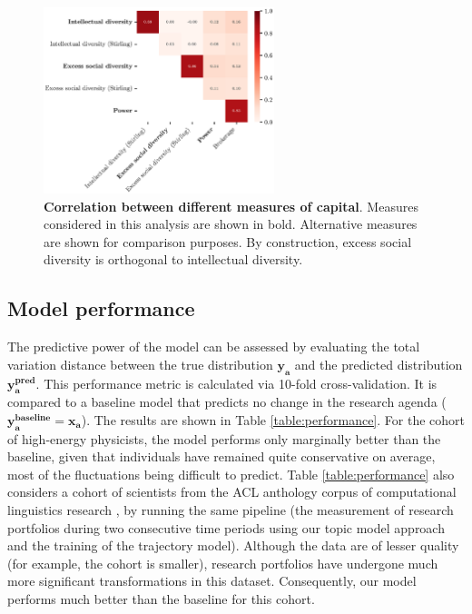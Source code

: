 \documentclass{article}
\begin{document}
\begin{figure}[h]
    \centering
    \includegraphics[width=0.6\textwidth]{plots/capital_measures.eps}
    \caption{\textbf{Correlation between different measures of capital}. Measures considered in this analysis are shown in bold. Alternative measures are shown for comparison purposes. By construction, excess social diversity is orthogonal to intellectual diversity. }
    \label{fig:capital_measures}
\end{figure}

\subsection{\label{appendix:model-performance}Model performance}

The predictive power of the model can be assessed by evaluating the total variation distance between the true distribution $\bm{y_a}$ and the predicted distribution $\bm{y_a^{\text{pred}}}$. This performance metric is calculated via 10-fold cross-validation. It is compared  to a baseline model that predicts no change in the research agenda ($\bm{y_a^{\text{baseline}}}=\bm{x_a}$). The results are shown in Table \ref{table:performance}. For the cohort of high-energy physicists, the model performs only marginally better than the baseline, given that individuals have remained quite conservative on average, most of the fluctuations being difficult to predict. Table \ref{table:performance} also considers a cohort of scientists from the ACL anthology corpus  of computational linguistics research \citep{acl_anthology_corpus}, by running the same pipeline (the measurement of research portfolios during two consecutive time periods using our topic model approach and the training of the trajectory model). Although the data are of lesser quality (for example, the cohort is smaller), research portfolios have undergone much more significant transformations in this dataset. Consequently, our model performs much better than the baseline for this cohort.
\end{document}
